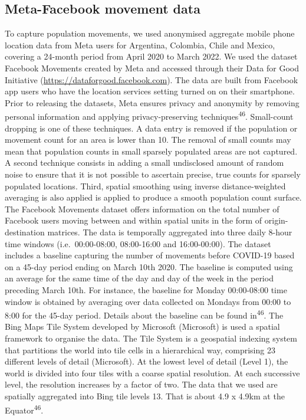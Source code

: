\documentclass[
  11pt,
]{article}
\begin{document}
\subsection{Meta-Facebook movement
data}\label{meta-facebook-movement-data}

To capture population movements, we used anonymised aggregate mobile
phone location data from Meta users for Argentina, Colombia, Chile and
Mexico, covering a 24-month period from April 2020 to March 2022. We
used the dataset Facebook Movements created by Meta and accessed through
their Data for Good Initiative (\url{https://dataforgood.facebook.com}).
The data are built from Facebook app users who have the location
services setting turned on on their smartphone. Prior to releasing the
datasets, Meta ensures privacy and anonymity by removing personal
information and applying privacy-preserving
techniques\textsuperscript{46}. Small-count dropping is one of these
techniques. A data entry is removed if the population or movement count
for an area is lower than 10. The removal of small counts may mean that
population counts in small sparsely populated areas are not captured. A
second technique consists in adding a small undisclosed amount of random
noise to ensure that it is not possible to ascertain precise, true
counts for sparsely populated locations. Third, spatial smoothing using
inverse distance-weighted averaging is also applied is applied to
produce a smooth population count surface. The Facebook Movements
dataset offers information on the total number of Facebook users moving
between and within spatial units in the form of origin-destination
matrices. The data is temporally aggregated into three daily 8-hour time
windows (i.e.~00:00-08:00, 08:00-16:00 and 16:00-00:00). The dataset
includes a baseline capturing the number of movements before COVID-19
based on a 45-day period ending on March 10th 2020. The baseline is
computed using an average for the same time of the day and day of the
week in the period preceding March 10th. For instance, the baseline for
Monday 00:00-08:00 time window is obtained by averaging over data
collected on Mondays from 00:00 to 8:00 for the 45-day period. Details
about the baseline can be found in\textsuperscript{46}. The Bing Maps
Tile System developed by Microsoft (Microsoft) is used a spatial
framework to organise the data. The Tile System is a geospatial indexing
system that partitions the world into tile cells in a hierarchical way,
comprising 23 different levels of detail (Microsoft). At the lowest
level of detail (Level 1), the world is divided into four tiles with a
coarse spatial resolution. At each successive level, the resolution
increases by a factor of two. The data that we used are spatially
aggregated into Bing tile levels 13. That is about 4.9 x 4.9km at the
Equator\textsuperscript{46}.
\end{document}
